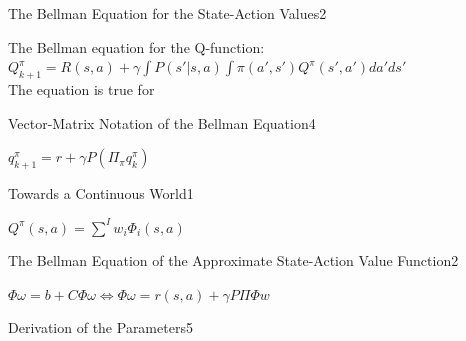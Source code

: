 \newif\ifvimbug
\vimbugfalse

\ifvimbug

	\fi
{}

\begin{questions}
	
\begin{question}{The Bellman Equation for the State-Action Values}{2}

\begin{answer}
	
	The Bellman equation for the Q-function:
	$Q^\pi_{k+1} = R(s,a)+ \gamma\int P(s'|s,a) \int \pi(a',s') Q^\pi(s',a') da' ds'$
	\\
	The equation is true for %
\end{answer}
\end{question}

\begin{question}{Vector-Matrix Notation of the Bellman Equation}{4}

\begin{answer}
	
	$q_{k+1}^\pi = r+ \gamma  P  (\Pi_\pi q_{k}^\pi)$
\end{answer}
\end{question}

\begin{question}{Towards a Continuous World}{1}
	
	\begin{answer}
		
		$Q^\pi(s,a) =\sum^{I}w_i  \Phi_i(s,a)$
	\end{answer}
\end{question}
	
\begin{question}{The Bellman Equation of the Approximate State-Action Value Function}{2}
	
	\begin{answer}
		
		$\Phi\omega = b + C\Phi\omega \Leftrightarrow \Phi\omega  = r(s,a) + \gamma P\Pi\Phi w$
	\end{answer}
\end{question}


\begin{question}{Derivation of the Parameters}{5}
	

\end{question}
\end{questions}
